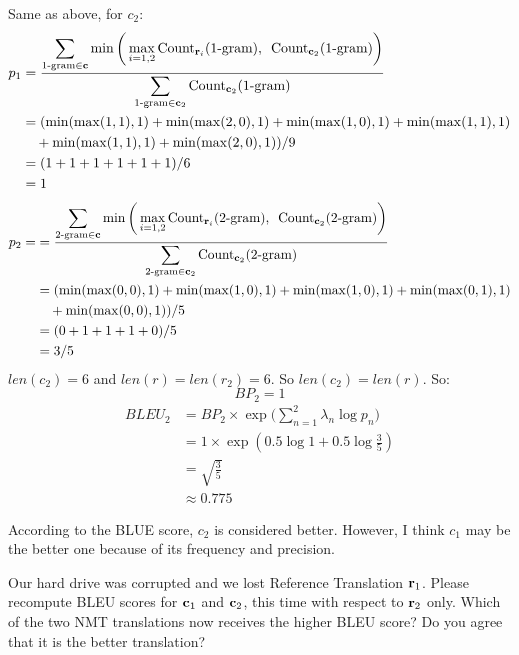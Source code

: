 \begin{parts}
\begin{subparts}
{            Same as above, for $c_2$:
            \begin{align*}
                p_1
                & = \frac{ \displaystyle \sum_{\text{1-gram} \in \mathbf{c}} \min \bigg( \max_{i=1,2} \text{Count}_{\mathbf{r}_i}(\text{1-gram}), \enspace \text{Count}_{\mathbf{c}_2}(\text{1-gram}) \bigg) }{\displaystyle \sum_{\text{1-gram}\in \mathbf{c}_2} \text{Count}_{\mathbf{c}_2}(\text{1-gram})} \\
                & = (\min(\max(1, 1), 1)+\min(\max(2, 0), 1)+\min(\max(1, 0), 1)+\min(\max(1, 1), 1) \\
                & \quad +\min(\max(1, 1), 1) +\min(\max(2, 0), 1))/9 \\
                & = (1+1+1+1+1+1)/6 \\
                & = 1
            \end{align*}
            \begin{align*}
                p_2 = 
                & = \frac{ \displaystyle \sum_{\text{2-gram} \in \mathbf{c}} \min \bigg( \max_{i=1,2} \text{Count}_{\mathbf{r}_i}(\text{2-gram}), \enspace \text{Count}_{\mathbf{c}_2}(\text{2-gram}) \bigg) }{\displaystyle \sum_{\text{2-gram}\in \mathbf{c}_2} \text{Count}_{\mathbf{c}_2}(\text{2-gram})} \\
                & = (\min(\max(0, 0), 1)+\min(\max(1, 0), 1)+\min(\max(1, 0), 1)+\min(\max(0, 1), 1) \\
                & \quad + \min(\max(0, 0), 1)) / 5 \\
                & = (0+1+1+1+0)/5 \\
                & = 3/5
            \end{align*}
            $len(c_2) = 6$ and $len(r) = len(r_2) = 6$. So $len(c_2) = len(r)$. So:
            \[BP_2=1\]
            \begin{align*}
                BLEU_2
                & = BP_2 \times \exp \Big( \sum_{n=1}^2 \lambda_n \log p_n \Big) \\
                & = 1 \times \exp(0.5 \log 1 + 0.5 \log \frac{3}{5}) \\
                & = \sqrt{\frac{3}{5}} \\
                & \approx  0.775
            \end{align*}

            According to the BLUE score, $c_2$ is considered better. However, I think $c_1$ may be the better one because of its frequency and precision.
        }
        
        \subpart[5] Our hard drive was corrupted and we lost Reference Translation $\mathbf{r}_1$. Please recompute BLEU scores for $\mathbf{c}_1$ and $\mathbf{c}_2$, this time with respect to $\mathbf{r}_2$ only. Which of the two NMT translations now receives the higher BLEU score? Do you agree that it is the better translation?
        

\end{subparts}
\end{parts}
